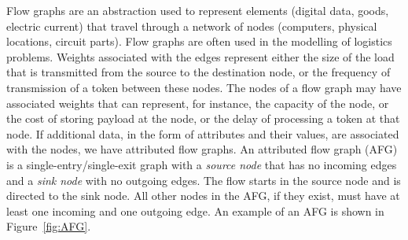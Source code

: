 

Flow graphs are an abstraction used to represent elements (\eg digital data, goods, electric current) that travel through a network of nodes (\eg computers, physical locations, circuit parts). Flow graphs are often used in the modelling of logistics problems. Weights associated with the edges represent either the size of the load that is transmitted from the source to the destination node, or the frequency of transmission of a token between these nodes. The nodes of a flow graph may have associated weights that can represent, for instance, the capacity of the node, or the cost of storing payload at the node, or the delay of processing a token at that node. If additional data, in the form of attributes and their values, are associated with the nodes, we have attributed flow graphs. An attributed flow graph (AFG) is a single-entry/single-exit graph with a \emph{source node} that has no incoming edges and a \emph{sink node} with no outgoing edges. The flow starts in the source node and is directed to the sink node. All other nodes in the AFG, if they exist, must have at least one incoming and one outgoing edge. An example of an AFG is shown in Figure~\ref{fig:AFG}.

